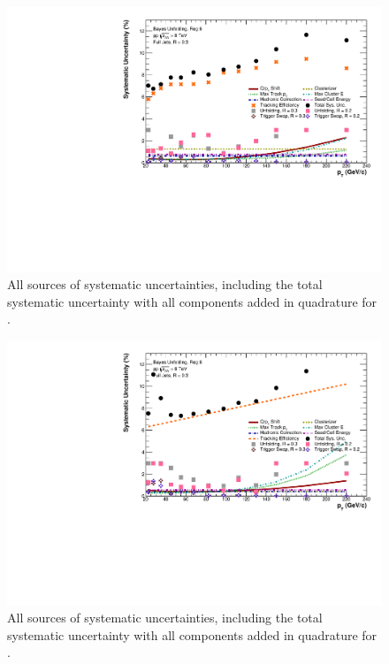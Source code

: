 \begin{figure}
    \centering
    \includegraphics[width=15cm]{figures/Systematics/ratios/TotalSystematics_R02R03.pdf}
    \caption{All sources of systematic uncertainties, including the total systematic uncertainty with all components added in quadrature for \pp.}
    \label{fig:SystematicsRatiosR02}
\end{figure}

\begin{figure}
    \centering
    \includegraphics[width=15cm]{figures/pPbFigures/Systematics/ratios/TotalSystematics_R02R03.pdf}
    \caption{All sources of systematic uncertainties, including the total systematic uncertainty with all components added in quadrature for \pp.}
    \label{fig:SystematicsRatiosR02pPb}
\end{figure}

